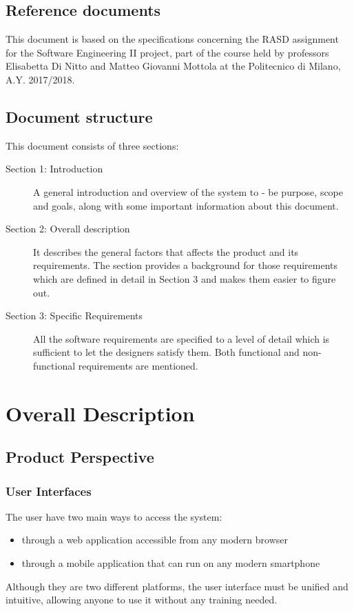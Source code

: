 \documentclass{report}
\begin{document}
	
	\section{Reference documents}
	This document is based on the specifications concerning the RASD assignment for the Software Engineering II project, part of the course held by professors Elisabetta Di Nitto and Matteo Giovanni Mottola at the Politecnico di Milano, A.Y. 2017/2018.
	
	
	\section{Document structure}
	This document consists of three sections:

	\begin{description}
	\item[Section 1: Introduction] A general introduction and overview of the system to - be purpose, scope and goals, along with some important information about this document.
	\item[Section 2: Overall description] It describes the general factors that affects the product and its requirements. The section provides a background for those requirements which are defined in detail in Section 3 and makes them easier to figure out.
	\item[Section 3: Specific Requirements] All the software requirements are specified to a level of detail which is sufficient to let the designers satisfy them. Both functional and non-functional requirements are mentioned.
	\end{description}
	
	
	\chapter{Overall Description}	
	
	
	\section{Product Perspective}
	
	
	\subsection{User Interfaces}
	The user have two main ways to access the system:
	\begin{itemize}
	\item through a web application accessible from any modern browser
	\item through a mobile application that can run on any modern smartphone
	\end{itemize}
	Although they are two different platforms, the user interface must be unified and intuitive, allowing anyone to use it without any training needed.
\end{document}
